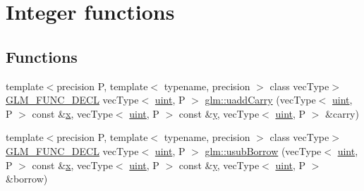 \hypertarget{group__core__func__integer}{}\section{Integer functions}
\label{group__core__func__integer}
\subsection*{Functions}
\begin{DoxyCompactItemize}
\item 
{\footnotesize template$<$precision P, template$<$ typename, precision $>$ class vec\+Type$>$ }\\\mbox{\hyperlink{setup_8hpp_ab2d052de21a70539923e9bcbf6e83a51}{G\+L\+M\+\_\+\+F\+U\+N\+C\+\_\+\+D\+E\+CL}} vec\+Type$<$ \mbox{\hyperlink{group__core__precision_ga4fd29415871152bfb5abd588334147c8}{uint}}, P $>$ \mbox{\hyperlink{group__core__func__integer_ga2fc1a46e7b7e9fbbd8fa444fbacaa2aa}{glm\+::uadd\+Carry}} (vec\+Type$<$ \mbox{\hyperlink{group__core__precision_ga4fd29415871152bfb5abd588334147c8}{uint}}, P $>$ const \&\mbox{\hyperlink{glad_8h_a92d0386e5c19fb81ea88c9f99644ab1d}{x}}, vec\+Type$<$ \mbox{\hyperlink{group__core__precision_ga4fd29415871152bfb5abd588334147c8}{uint}}, P $>$ const \&\mbox{\hyperlink{glad_8h_a66ddd433d2cacfe27f5906b7e86faeed}{y}}, vec\+Type$<$ \mbox{\hyperlink{group__core__precision_ga4fd29415871152bfb5abd588334147c8}{uint}}, P $>$ \&carry)
\item 
{\footnotesize template$<$precision P, template$<$ typename, precision $>$ class vec\+Type$>$ }\\\mbox{\hyperlink{setup_8hpp_ab2d052de21a70539923e9bcbf6e83a51}{G\+L\+M\+\_\+\+F\+U\+N\+C\+\_\+\+D\+E\+CL}} vec\+Type$<$ \mbox{\hyperlink{group__core__precision_ga4fd29415871152bfb5abd588334147c8}{uint}}, P $>$ \mbox{\hyperlink{group__core__func__integer_ga22a889bf08313b7e547e2cdb8bb15ee4}{glm\+::usub\+Borrow}} (vec\+Type$<$ \mbox{\hyperlink{group__core__precision_ga4fd29415871152bfb5abd588334147c8}{uint}}, P $>$ const \&\mbox{\hyperlink{glad_8h_a92d0386e5c19fb81ea88c9f99644ab1d}{x}}, vec\+Type$<$ \mbox{\hyperlink{group__core__precision_ga4fd29415871152bfb5abd588334147c8}{uint}}, P $>$ const \&\mbox{\hyperlink{glad_8h_a66ddd433d2cacfe27f5906b7e86faeed}{y}}, vec\+Type$<$ \mbox{\hyperlink{group__core__precision_ga4fd29415871152bfb5abd588334147c8}{uint}}, P $>$ \&borrow)
\item 

\end{DoxyCompactItemize}
